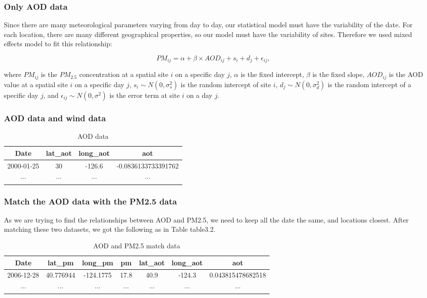 \documentclass[10pt]{article}
\begin{document}
\subsubsection{Only AOD data}
Since there are many meteorological parameters varying from day to day, our statistical model must have the variability of the date. For each location, there are many different geographical properties, so our model must have the variability of sites. Therefore we used mixed effects model to fit this relationship:

$$PM_{ij} = \alpha + \beta\times AOD_{ij} + s_i + d_j+ \epsilon_{ij}, $$

where $PM_{ij}$ is the $PM_{2.5}$ concentration at a spatial site $i$ on a specific day $j$, $\alpha$ is the fixed intercept, $\beta$ is the fixed slope, $AOD_{ij}$ is the AOD value at a spatial site $i$ on a specific day $j$, $s_i\sim N(0, \sigma_s^2)$ is the random intercept of site $i$, $d_j\sim N(0, \sigma_d^2)$ is the random intercept of a specific day $j$, and $\epsilon_{ij}\sim N(0, \sigma^2)$ is the error term at site $i$ on a day $j$.

\subsubsection{AOD data and wind data}

\begin{table}[!h]
\centering
\begin{tabular}{|c|c|c|c|}
\hline 
Date & lat\_aot & long\_aot & aot\\
\hline
2000-01-25 & 30 & -126.6 & -0.0836133733391762 \\
\hline
$\cdots$ & $\cdots$ & $\cdots$ & $\cdots$\\
\hline
\end{tabular}
\caption{AOD data}
\label{table3.1}
\end{table}

\subsubsection{Match the AOD data with the PM2.5 data}
As we are trying to find the relationships between AOD and PM2.5, we need to keep all the date the same, and locations closest. After matching these two datasets, we got the following as in Table {table3.2}.

\begin{table}[!h]
\centering
\begin{tabular}{|c|c|c|c|c|c|c|}
\hline 
Date & lat\_pm & long\_pm & pm & lat\_aot & long\_aot & aot\\
\hline
2006-12-28 & 40.776944 & -124.1775 & 17.8 & 40.9 & -124.3 & 0.043815478682518\\
\hline
$\cdots$ & $\cdots$ & $\cdots$ & $\cdots$ & $\cdots$ & $\cdots$ & $\cdots$\\
\hline
\end{tabular}
\caption{AOD and PM2.5 match data}
\label{table3.2}
\end{table}
\end{document}
